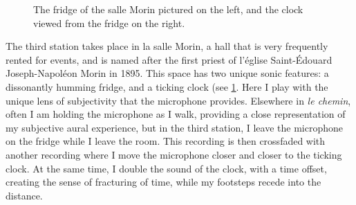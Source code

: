 \documentclass[12pt,twoside,maitrise]{dms_ks}
\theoremstyle{definition}
\begin{document}
{\begin{figure}[h]
    \centering
    \caption{The fridge of the salle Morin pictured on the left, and the clock viewed from the fridge on the right.}
    \label{fig:station3}
\end{figure}

The third station takes place in la salle Morin, a hall that is very frequently rented for events, and is named after the first priest of l'église Saint-Édouard Joseph-Napoléon Morin in 1895. 
This space has two unique sonic features: a dissonantly humming fridge, and a ticking clock (see \cref{fig:station3}. 
Here I play with the unique lens of subjectivity that the microphone provides. 
Elsewhere in \textit{le chemin}, often I am holding the microphone as I walk, providing a close representation of my subjective aural experience, but in the third station, I leave the microphone on the fridge while I leave the room. 
This recording is then crossfaded with another recording where I move the microphone closer and closer to the ticking clock. 
At the same time, I double the sound of the clock, with a time offset, creating the sense of fracturing of time, while my footsteps recede into the distance.

}
\end{document}
